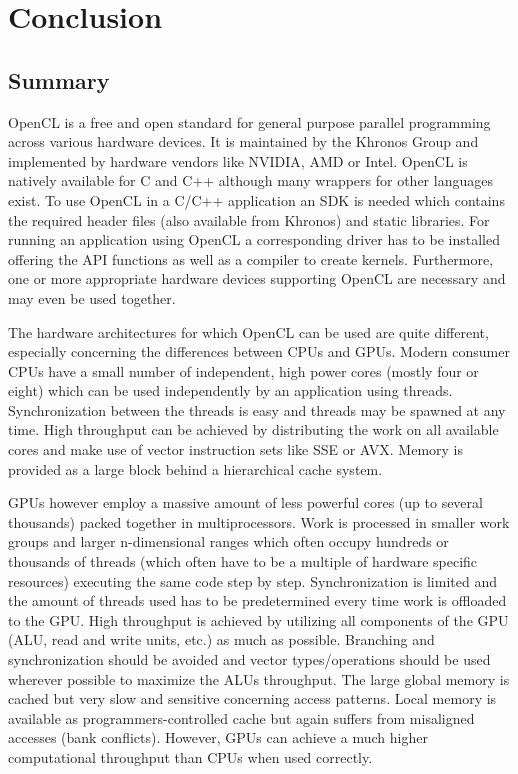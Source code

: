\chapter{Conclusion}
\label{sec:conclusion}

\section{Summary}

OpenCL is a free and open standard for general purpose parallel programming across various hardware devices. It is maintained by the Khronos Group and implemented by hardware vendors like NVIDIA, AMD or Intel. OpenCL is natively available for C and C++ although many wrappers for other languages exist. To use OpenCL in a C/C++ application an SDK is needed which contains the required header files (also available from Khronos) and static libraries. For running an application using OpenCL a corresponding driver has to be installed offering the API functions as well as a compiler to create kernels. Furthermore, one or more appropriate hardware devices supporting OpenCL are necessary and may even be used together.

The hardware architectures for which OpenCL can be used are quite different, especially concerning the differences between CPUs and GPUs.
Modern consumer CPUs have a small number of independent, high power cores (mostly four or eight) which can be used independently by an application using threads. Synchronization between the threads is easy and threads may be spawned at any time. High throughput can be achieved by distributing the work on all available cores and make use of vector instruction sets like SSE or AVX. Memory is provided as a large block behind a hierarchical cache system.

GPUs however employ a massive amount of less powerful cores (up to several thousands) packed together in multiprocessors. Work is processed in smaller work groups and larger n-dimensional ranges which often occupy hundreds or thousands of threads (which often have to be a multiple of hardware specific resources) executing the same code step by step. Synchronization is limited and the amount of threads used has to be predetermined every time work is offloaded to the GPU. High throughput is achieved by utilizing all components of the GPU (ALU, read and write units, etc.) as much as possible. Branching and synchronization should be avoided and vector types/operations should be used wherever possible to maximize the ALUs throughput. The large global memory is cached but very slow and sensitive concerning access patterns. Local memory is available as programmers-controlled cache but again suffers from misaligned accesses (bank conflicts). However, GPUs can achieve a much higher computational throughput than CPUs when used correctly.

